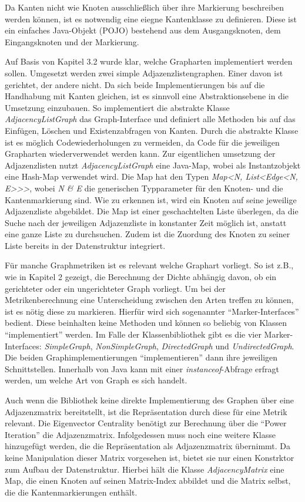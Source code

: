 \documentclass[a4paper,12pt,ngerman,chapterprefix=false,listof=totoc,bibliography=totoc]{scrreprt}
\begin{document}
{{{Da Kanten nicht wie Knoten ausschließlich über ihre Markierung beschreiben werden können, ist es notwendig eine eiegne Kantenklasse zu definieren. Diese ist ein einfaches Java-Objekt (POJO) bestehend aus dem Ausgangsknoten, dem Eingangsknoten und der Markierung.

Auf Basis von Kapitel 3.2 wurde klar, welche Grapharten implementiert werden sollen. Umgesetzt werden zwei simple Adjazenzlistengraphen. Einer davon ist gerichtet, der andere nicht. Da sich beide Implementierungen bis auf die Handhabung mit Kanten gleichen, ist es sinnvoll eine Abstraktionsebene in die Umsetzung einzubauen. So implementiert die abstrakte Klasse \textit{AdjacencyListGraph} das Graph-Interface und definiert alle Methoden bis auf das Einfügen, Löschen und Existenzabfragen von Kanten. Durch die abstrakte Klasse ist es möglich Codewiederholungen zu vermeiden, da Code für die jeweiligen Grapharten wiederverwendet werden kann. Zur eigentlichen umsetzung der Adjazenzlisten nutzt \textit{AdjacencyListGraph} eine Java-Map, wobei als Instantzobjekt eine Hash-Map verwendet wird. Die Map hat den Typen \textit{Map\textless N, List\textless Edge\textless N, E\textgreater\textgreater\textgreater}, wobei \textit{N \& E} die generischen Typparameter für den Knoten- und die Kantenmarkierung sind. Wie zu erkennen ist, wird ein Knoten auf seine jeweilige Adjazenzliste abgebildet. Die Map ist einer geschachtelten Liste überlegen, da die Suche nach der jeweiligen Adjazenzliste in konstanter Zeit möglich ist, anstatt eine ganze Liste zu durchsuchen. Zudem ist die Zuordung des Knoten zu seiner Liste bereits in der Datenstruktur integriert.

Für manche Graphmetriken ist es relevant welche Graphart vorliegt. So ist z.B., wie in Kapitel 2 gezeigt, die Berechnung der Dichte abhängig davon, ob ein gerichteter oder ein ungerichteter Graph vorliegt. Um bei der Metrikenberechnung eine Unterscheidung zwischen den Arten treffen zu können, ist es nötig diese zu markieren. Hierfür wird sich sogenannter "`Marker-Interfaces"' bedient. Diese beinhalten keine Methoden und können so beliebig von Klassen "`implementiert"' werden. Im Falle der Klassenbibliothek gibt es die vier Marker-Interfaces: \textit{SimpleGraph}, \textit{NonSimpleGraph}, \textit{DirectedGraph} und \textit{UndirectedGraph}. Die beiden Graphimplementierungen "`implementieren"' dann ihre jeweiligen Schnittstellen. Innerhalb von Java kann mit einer \textit{instanceof}-Abfrage erfragt werden, um welche Art von Graph es sich handelt.

Auch wenn die Bibliothek keine direkte Implementierung des Graphen über eine Adjazenzmatrix bereitstellt, ist die Repräsentation durch diese für eine Metrik relevant. Die Eigenvector Centrality benötigt zur Berechnung über die "`Power Iteration"' die Adjazenzmatrix. Infolgedessen muss noch eine weitere Klasse hinzugefügt werden, die die Repräsentation als Adjazenzmatrix übernimmt. Da keine Manipulation dieser Matrix vorgesehen ist, bietet sie nur einen Konstrktor zum Aufbau der Datenstruktur. Hierbei hält die Klasse \textit{AdjacencyMatrix} eine Map, die einen Knoten auf seinen Matrix-Index abbildet und die Matrix selbst, die die Kantenmarkierungen enthält.

}}}
\end{document}
